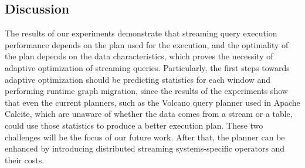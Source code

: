 %             
%             
%             


\subsection{Discussion}

The results of our experiments demonstrate that streaming query execution performance depends on the plan used for the execution, and the optimality of the plan depends on the data characteristics, which proves the necessity of adaptive optimization of streaming queries. Particularly, the first steps towards adaptive optimization should be predicting statistics for each window and performing runtime graph migration, since the results of the experiments show that even the current planners, such as the Volcano query planner \cite{graefe1993volcano} used in Apache Calcite, which are unaware of whether the data comes from a stream or a table, could use those statistics to produce a better execution plan. These two challenges will be the focus of our future work. After that, the planner can be enhanced by introducing distributed streaming systems-specific operators and their costs.



